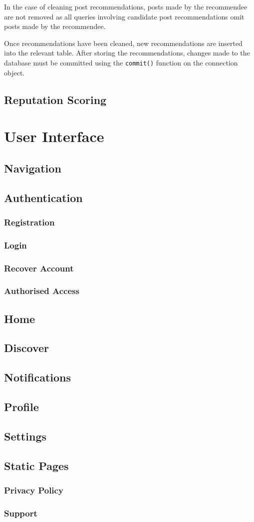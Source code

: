 In the case of cleaning post recommendations, posts made by the recommendee are not removed as all queries involving candidate post recommendations omit posts made by the recommendee.

Once recommendations have been cleaned, new recommendations are inserted into the relevant table. After storing the recommendations, changes made to the database must be committed using the \texttt{commit()} function on the connection object.

\subsection{Reputation Scoring}

\section{User Interface}
\subsection{Navigation}
\subsection{Authentication}
\subsubsection{Registration}
\subsubsection{Login}
\subsubsection{Recover Account}
\subsubsection{Authorised Access}
\subsection{Home}
\subsection{Discover}
\subsection{Notifications}
\subsection{Profile}
\subsection{Settings}
\subsection{Static Pages}
\subsubsection{Privacy Policy}
\subsubsection{Support}